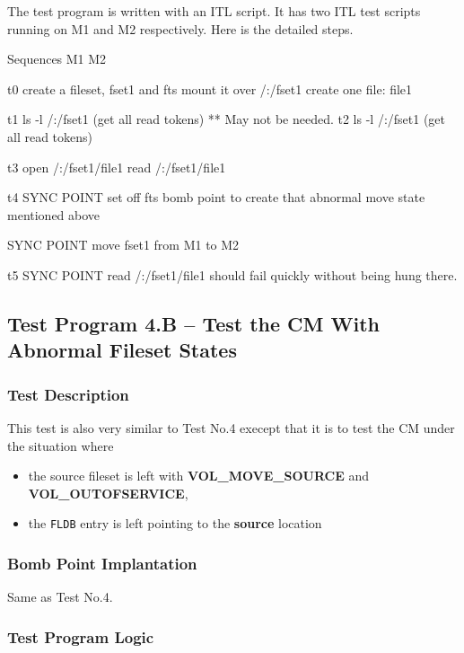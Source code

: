 The test program is written with an ITL script. It has two ITL test scripts
running on M1 and M2 respectively. Here is the detailed steps. 

\begin{programexample}

Sequences	M1					M2

t0		create a fileset, fset1 and fts mount it over /:/fset1
		create one file: file1
            
t1							ls -l /:/fset1
							(get all read tokens)
							** May not be needed. 
t2		ls -l /:/fset1
		(get all read tokens)
		

t3		open /:/fset1/file1
		read /:/fset1/file1

t4		SYNC POINT	
		set off fts bomb point to create 
		that abnormal move state mentioned above

		SYNC POINT
		move fset1 from M1 to M2


t5		SYNC POINT
		read /:/fset1/file1 
		should fail quickly without being
		hung there. 

\end{programexample}

\subsection {Test Program 4.B -- Test the CM With Abnormal Fileset States}

\subsubsection {Test Description}

This test is also very similar to Test No.4 execept that it is to test the CM 
under the situation where 
\begin{itemize}
\item
the source fileset is left with {\bf VOL_MOVE_SOURCE} and {\bf VOL_OUTOFSERVICE},
\item the {\tt FLDB} entry is left pointing to the {\bf source} location
\end{itemize}

\subsubsection {Bomb Point Implantation}

Same as Test No.4.

\subsubsection {Test Program Logic}

